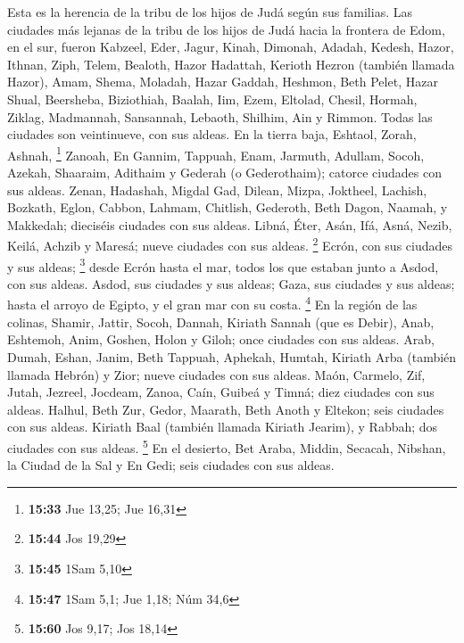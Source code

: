  Esta es la herencia de la tribu de los hijos de Judá
según sus familias.  Las ciudades más lejanas de la tribu
de los hijos de Judá hacia la frontera de Edom, en el sur, fueron
Kabzeel, Eder, Jagur,  Kinah, Dimonah, Adadah,
 Kedesh, Hazor, Ithnan,  Ziph, Telem,
Bealoth,  Hazor Hadattah, Kerioth Hezron (también llamada
Hazor),  Amam, Shema, Moladah,  Hazar
Gaddah, Heshmon, Beth Pelet,  Hazar Shual, Beersheba,
Biziothiah,  Baalah, Iim, Ezem,  Eltolad,
Chesil, Hormah,  Ziklag, Madmannah, Sansannah,
 Lebaoth, Shilhim, Ain y Rimmon. Todas las ciudades son
veintinueve, con sus aldeas.  En la tierra baja, Eshtaol,
Zorah, Ashnah, \footnote{\textbf{15:33} Jue 13,25; Jue 16,31}
 Zanoah, En Gannim, Tappuah, Enam, 
Jarmuth, Adullam, Socoh, Azekah,  Shaaraim, Adithaim y
Gederah (o Gederothaim); catorce ciudades con sus aldeas.
 Zenan, Hadashah, Migdal Gad,  Dilean,
Mizpa, Joktheel,  Lachish, Bozkath, Eglon,
 Cabbon, Lahmam, Chitlish,  Gederoth, Beth
Dagon, Naamah, y Makkedah; dieciséis ciudades con sus aldeas.
 Libná, Éter, Asán,  Ifá, Asná, Nezib,
 Keilá, Achzib y Maresá; nueve ciudades con sus aldeas.
\footnote{\textbf{15:44} Jos 19,29}  Ecrón, con sus
ciudades y sus aldeas; \footnote{\textbf{15:45} 1Sam 5,10}
 desde Ecrón hasta el mar, todos los que estaban junto a
Asdod, con sus aldeas.  Asdod, sus ciudades y sus aldeas;
Gaza, sus ciudades y sus aldeas; hasta el arroyo de Egipto, y el gran
mar con su costa. \footnote{\textbf{15:47} 1Sam 5,1; Jue 1,18; Núm 34,6}
 En la región de las colinas, Shamir, Jattir, Socoh,
 Dannah, Kiriath Sannah (que es Debir), 
Anab, Eshtemoh, Anim,  Goshen, Holon y Giloh; once
ciudades con sus aldeas.  Arab, Dumah, Eshan,
 Janim, Beth Tappuah, Aphekah,  Humtah,
Kiriath Arba (también llamada Hebrón) y Zior; nueve ciudades con sus
aldeas.  Maón, Carmelo, Zif, Jutah, 
Jezreel, Jocdeam, Zanoa,  Caín, Guibeá y Timná; diez
ciudades con sus aldeas.  Halhul, Beth Zur, Gedor,
 Maarath, Beth Anoth y Eltekon; seis ciudades con sus
aldeas.  Kiriath Baal (también llamada Kiriath Jearim), y
Rabbah; dos ciudades con sus aldeas. \footnote{\textbf{15:60} Jos 9,17;
  Jos 18,14}  En el desierto, Bet Araba, Middin, Secacah,
 Nibshan, la Ciudad de la Sal y En Gedi; seis ciudades
con sus aldeas.

